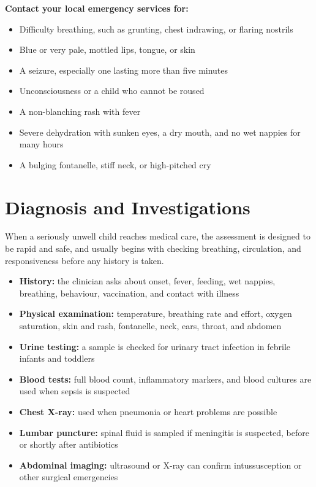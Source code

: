 \textbf{Contact your local emergency services for:}
\begin{itemize}
    \item Difficulty breathing, such as grunting, chest indrawing, or flaring nostrils
    \item Blue or very pale, mottled lips, tongue, or skin
    \item A seizure, especially one lasting more than five minutes
    \item Unconsciousness or a child who cannot be roused
    \item A non-blanching rash with fever
    \item Severe dehydration with sunken eyes, a dry mouth, and no wet nappies for many hours
    \item A bulging fontanelle, stiff neck, or high-pitched cry
\end{itemize}

\section*{Diagnosis and Investigations}
When a seriously unwell child reaches medical care, the assessment is designed to be rapid and safe, and usually begins with checking breathing, circulation, and responsiveness before any history is taken.

\begin{itemize}
    \item \textbf{History:} the clinician asks about onset, fever, feeding, wet nappies, breathing, behaviour, vaccination, and contact with illness
    \item \textbf{Physical examination:} temperature, breathing rate and effort, oxygen saturation, skin and rash, fontanelle, neck, ears, throat, and abdomen
    \item \textbf{Urine testing:} a sample is checked for urinary tract infection in febrile infants and toddlers
    \item \textbf{Blood tests:} full blood count, inflammatory markers, and blood cultures are used when sepsis is suspected
    \item \textbf{Chest X-ray:} used when pneumonia or heart problems are possible
    \item \textbf{Lumbar puncture:} spinal fluid is sampled if meningitis is suspected, before or shortly after antibiotics
    \item \textbf{Abdominal imaging:} ultrasound or X-ray can confirm intussusception or other surgical emergencies
\end{itemize}

